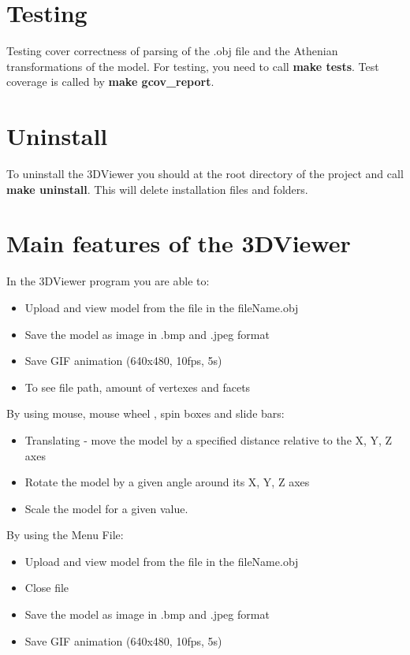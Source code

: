 \documentclass[12pt, a4paper]{article}
\begin{document}
\section{Testing}

Testing cover correctness of parsing of the .obj file and the Athenian transformations of the model.
For testing, you need to call \textbf{make tests}. Test coverage is called by \textbf{make gcov\_report}.


\section{Uninstall}

To uninstall the 3DViewer you should at  the root directory of the project and call \textbf{make uninstall}.
This will delete installation files and folders.


\vfill

\section{Main features of the 3DViewer}

In the 3DViewer program you are able to:
\begin{itemize}
    \item Upload and view model from the file in the fileName.obj
    \item Save the model as image in .bmp and .jpeg format
    \item Save GIF animation (640x480, 10fps, 5s)
    \item To see file path, amount of vertexes and facets
\end{itemize}

By using mouse, mouse wheel , spin boxes and slide bars:
\begin{itemize}
    \item Translating - move the model by a specified distance relative to the X, Y, Z axes
    \item Rotate the model by a given angle around its X, Y, Z axes
    \item Scale the model for a given value.
\end{itemize}

By using the Menu File:
\begin{itemize}
    \item Upload and view model from the file in the fileName.obj
    \item Close file
    \item Save the model as image in .bmp and .jpeg format
    \item Save GIF animation (640x480, 10fps, 5s)
\end{itemize}
\end{document}
